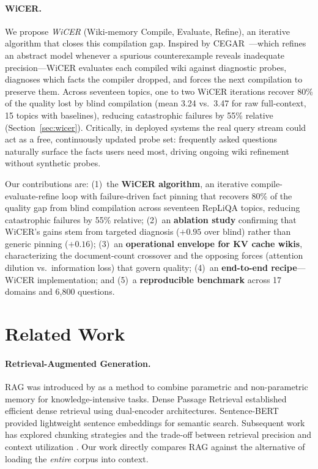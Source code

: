 \documentclass{article}
\begin{document}
\paragraph{WiCER.}
We propose \emph{WiCER} (Wiki-memory Compile, Evaluate, Refine), an
iterative algorithm that closes this compilation gap. Inspired by
CEGAR~\cite{clarke2000cegar}---which refines an abstract model whenever
a spurious counterexample reveals inadequate precision---WiCER evaluates
each compiled wiki against diagnostic probes, diagnoses which facts the
compiler dropped, and forces the next compilation to preserve them.
Across seventeen topics, one to two WiCER iterations recover 80\% of the
quality lost by blind compilation (mean 3.24 vs.\ 3.47 for raw
full-context, 15 topics with baselines), reducing catastrophic failures by 55\% relative
(Section~\ref{sec:wicer}). Critically, in deployed systems the real
query stream could act as a free, continuously updated probe set: frequently
asked questions naturally surface the facts users need most, driving
ongoing wiki refinement without synthetic probes.

Our contributions are:
(1)~the \textbf{WiCER algorithm}, an iterative compile-evaluate-refine
loop with failure-driven fact pinning that recovers 80\% of the quality gap
from blind compilation across seventeen RepLiQA topics, reducing catastrophic failures
by 55\% relative;
(2)~an \textbf{ablation study} confirming that WiCER's gains stem from
targeted diagnosis ($+0.95$ over blind) rather than generic pinning
($+0.16$);
(3)~an \textbf{operational envelope for KV cache wikis}, characterizing the
document-count crossover and the opposing forces (attention dilution vs.\
information loss) that govern quality;
(4)~an \textbf{end-to-end recipe}--- WiCER implementation; and
(5)~a \textbf{reproducible benchmark} across 17 domains and 6{,}800 questions.

\section{Related Work}

\paragraph{Retrieval-Augmented Generation.}
RAG was introduced by \cite{lewis2020retrieval} as a method to combine
parametric and non-parametric memory for knowledge-intensive tasks. Dense
Passage Retrieval \cite{karpukhin2020dense} established efficient dense
retrieval using dual-encoder architectures. Sentence-BERT
\cite{reimers2019sentencebert} provided lightweight sentence embeddings for
semantic search. Subsequent work has explored chunking strategies and the
trade-off between retrieval precision and context utilization
\cite{gao2024retrievalaugmented}. Our work directly compares RAG against
the alternative of loading the \emph{entire} corpus into context.
\end{document}
